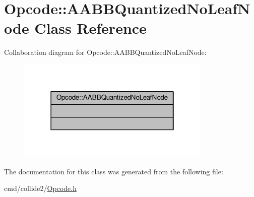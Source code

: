\hypertarget{classOpcode_1_1AABBQuantizedNoLeafNode}{}\section{Opcode\+:\+:A\+A\+B\+B\+Quantized\+No\+Leaf\+Node Class Reference}
\label{classOpcode_1_1AABBQuantizedNoLeafNode}


Collaboration diagram for Opcode\+:\+:A\+A\+B\+B\+Quantized\+No\+Leaf\+Node\+:
\nopagebreak
\begin{figure}[H]
\begin{center}
\leavevmode
\includegraphics[width=262pt]{d0/d53/classOpcode_1_1AABBQuantizedNoLeafNode__coll__graph}
\end{center}
\end{figure}


The documentation for this class was generated from the following file\+:\begin{DoxyCompactItemize}
\item 
cmd/collide2/\hyperlink{Opcode_8h}{Opcode.\+h}\end{DoxyCompactItemize}
